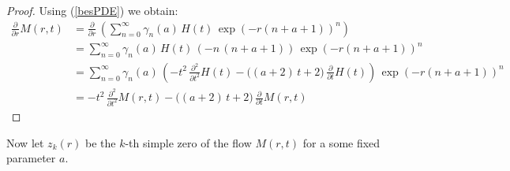 \documentclass[a4paper,11pt,twoside]{amsart}
\newcommand{\verifiedeq}{=}
\newcommand{\verifiedeq}{\stackrel{\checkmark}{=}}
\begin{document}
\begin{proof}
Using (\ref{besPDE}) we obtain:
\begin{align}
 \frac{\partial}{\partial r}M(r,t) &\verifiedeq  \frac{\partial}{\partial r}\,\left(\sum_{n=0}^\infty \gamma_n(a)\,H(t)\,\exp(-r(n+a+1))^{n}\right) \\
 &\verifiedeq \sum_{n=0}^\infty \gamma_n(a)\,H(t)\,\left(-n\,(n+a+1)\right)\,\exp(-r(n+a+1))^{n} \\
 &\verifiedeq \sum_{n=0}^\infty \gamma_n(a)\,\left(-t^2\,\frac{\partial^2}{\partial t^2}H(t)- \big((a+2)\,t+2\big)\, \frac{\partial}{\partial t}H(t)  \right)\, \exp(-r(n+a+1))^{n}\\
 &\verifiedeq-t^2\,\frac{\partial^2}{\partial t^2}M(r,t) - \big((a+2)\,t+2\big)\,\frac{\partial }{\partial t}M(r,t)
\end{align}
\end{proof}

Now let $z_k(r)$ be the $k$-th simple zero of the flow $M(r,t)$ for a some fixed parameter $a$.
 
\end{document}
